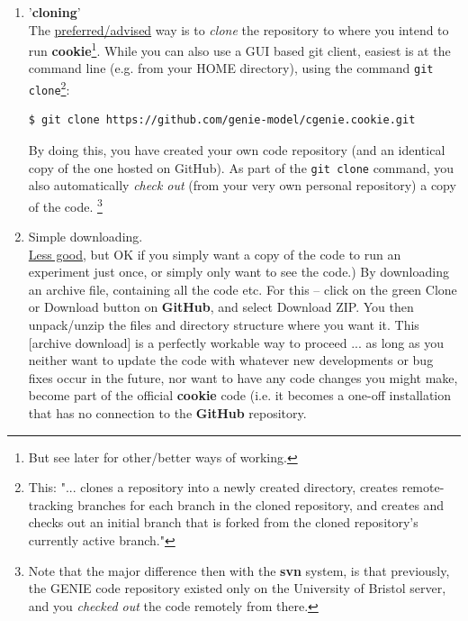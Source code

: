 \begin{enumerate}

\vspace{1mm}
\item '\textbf{cloning}'
\vspace{1mm}
\\The \uline{preferred/advised} way is to \textit{clone} the repository to where you intend to run \textbf{cookie}\footnote{But see later for other/better ways of working.}. While you can also use a GUI based git client, easiest is at the command line (e.g. from your HOME directory), using the command \texttt{git clone}\footnote{This: "... clones a repository into a newly created directory, creates remote-tracking branches for each branch in the cloned repository, and creates and checks out an initial branch that is forked from the cloned repository’s currently active branch."}:
\vspace{-1mm}
\begin{verbatim}
$ git clone https://github.com/genie-model/cgenie.cookie.git
\end{verbatim}
\vspace{-1mm}

By doing this, you have created your own code repository (and an identical copy of the one hosted on GitHub). As part of the \texttt{git clone} command, you also automatically \textit{check out} (from your very own personal repository) a copy of the code. \footnote{Note that the major difference then with the \textbf{svn} system, is that previously, the GENIE code repository existed only on the University of Bristol server, and you \textit{checked out} the code remotely from there.}

\vspace{1mm}
\item Simple downloading.
\vspace{1mm}
\\\uline{Less good}, but OK if you simply want a copy of the code to run an experiment just once, or simply only want to see the code.) By downloading an archive file, containing all the code etc. For this -- click on the \textcolor[rgb]{0,0.501961,0}{green} \textsf{\footnotesize Clone or Download} button on \textbf{GitHub}, and select \textsf{\footnotesize Download ZIP}. You then unpack/unzip the files and directory structure where you want it. This [archive download] is a perfectly workable way to proceed ... as long as you neither want to update the code with whatever new developments or bug fixes occur in the future, nor want to have any code changes you might make, become part of the official \textbf{cookie} code  (i.e. it becomes a one-off installation that has no connection to the \textbf{GitHub} repository.

\end{enumerate}

